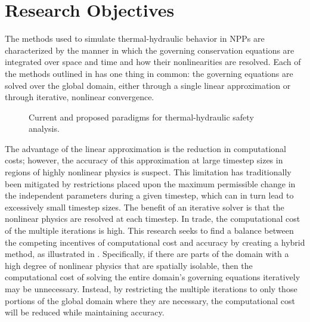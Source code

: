 \section{Research Objectives}
\label{sect:researchObjectives}

The methods used to simulate thermal-hydraulic behavior in NPPs are characterized by the manner in which the governing conservation equations are integrated over space and time and how their nonlinearities are resolved.
Each of the methods outlined in  has one thing in common: the governing equations are solved over the global domain, either through a single linear approximation or through iterative, nonlinear convergence.

\begin{figure}[ht!]
\centering

\caption{Current and proposed paradigms for thermal-hydraulic safety analysis.}
\label{fig:my_diagram}
\end{figure}

The advantage of the linear approximation is the reduction in computational costs; however, the accuracy of this approximation at large timestep sizes in regions of highly nonlinear physics is suspect.
This limitation has traditionally been mitigated by restrictions placed upon the maximum permissible change in the independent parameters during a given timestep, which can in turn lead to excessively small timestep sizes.
The benefit of an iterative solver is that the nonlinear physics are resolved at each timestep.
In trade, the computational cost of the multiple iterations is high.
This research seeks to find a balance between the competing incentives of computational cost and accuracy by creating a hybrid method, as illustrated in .
Specifically, if there are parts of the domain with a high degree of nonlinear physics that are spatially isolable, then the computational cost of solving the entire domain's governing equations iteratively may be unnecessary.
Instead, by restricting the multiple iterations to only those portions of the global domain where they are necessary, the computational cost will be reduced while maintaining accuracy. 

